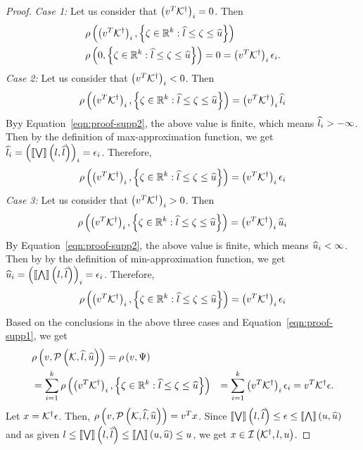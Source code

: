 \begin{proof}
{\it Case 1:} Let  us consider that $\left(v^T{\mathcal{K}}^\dagger\right)_i=0$.
Then
%
\begin{align*}
&
  \rho\left(\left(v^T{\mathcal{K}}^\dagger\right)_i,\left\{\zeta\in\mathbb{R}^k:\widehat{l}\leq\zeta\leq\widehat{u}\right\}\right)\\
& \rho\left(0,\left\{\zeta\in\mathbb{R}^k:\widehat{l}\leq\zeta\leq\widehat{u}\right\}\right)=0=\left(v^T{\mathcal{K}}^\dagger\right)_i\epsilon_i.
\end{align*}
%
{\it Case 2:} Let us consider that $\left(v^T{\mathcal{K}}^\dagger\right)_i<0$.
Then
%
\begin{align*}
&
  \rho\left(\left(v^T{\mathcal{K}}^\dagger\right)_i,\left\{\zeta\in\mathbb{R}^k:\widehat{l}\leq\zeta\leq\widehat{u}\right\}\right)=\left(v^T{\mathcal{K}}^\dagger\right)_i\widehat{l}_i\\
\end{align*}
%
Byy Equation~\ref{eqn:proof-supp2}, the above value is finite, which
means $\widehat{l}_i>-\infty$.  Then
by the definition of max-approximation function, we get
$\widehat{l}_i=\left(\left\llbracket\bigvee\right\rrbracket\left(l,\widehat{l}\right)\right)_i=\epsilon_i$.  Therefore,
%
\begin{align*}
&
  \rho\left(\left(v^T{\mathcal{K}}^\dagger\right)_i,\left\{\zeta\in\mathbb{R}^k:\widehat{l}\leq\zeta\leq\widehat{u}\right\}\right)=\left(v^T{\mathcal{K}}^\dagger\right)_i\epsilon_i\\
\end{align*}
%
{\it Case 3:}  Let us consider that
$\left(v^T{\mathcal{K}}^\dagger\right)_i>0$. Then
%
\begin{align*}
&
  \rho\left(\left(v^T{\mathcal{K}}^\dagger\right)_i,\left\{\zeta\in\mathbb{R}^k:\widehat{l}\leq\zeta\leq\widehat{u}\right\}\right)=\left(v^T{\mathcal{K}}^\dagger\right)_i\widehat{u}_i\\
\end{align*}
%
By Equation~\ref{eqn:proof-supp2}, the above value is finite, which
means $\widehat{u}_i<\infty$.  Then by
by the definition of min-approximation function, we get
$\widehat{u}_i=\left(\left\llbracket\bigwedge\right\rrbracket\left(l,\widehat{l}\right)\right)_i=\epsilon_i$.  Therefore,
%
\begin{align*}
&
  \rho\left(\left(v^T{\mathcal{K}}^\dagger\right)_i,\left\{\zeta\in\mathbb{R}^k:\widehat{l}\leq\zeta\leq\widehat{u}\right\}\right)=\left(v^T{\mathcal{K}}^\dagger\right)_i\epsilon_i\\
\end{align*}
%
Based on the conclusions in the above three
cases and Equation~\ref{eqn:proof-supp1}, we get
%
\begin{align*}
& \rho\left(v,\mathcal{P}\left(\mathcal{K},\widehat{l},\widehat{u}\right)\right)=\rho\left(v,\Psi\right)\\
& =
  \sum_{i=1}^k\rho\left(\left(v^T{\mathcal{K}}^\dagger\right)_i,\left\{\zeta\in\mathbb{R}^k:\widehat{l}\leq\zeta\leq\widehat{u}\right\}\right)
  & = \sum_{i=1}^k\left(v^T{\mathcal{K}}^\dagger\right)_i\epsilon_i=v^T{\mathcal{K}}^\dagger\epsilon.
\end{align*}
%
Let $x={\mathcal{K}}^\dagger\epsilon$.  Then,
$\rho\left(v,\mathcal{P}\left(\mathcal{K},\widehat{l},\widehat{u}\right)\right)=v^Tx$.  Since
$\left\llbracket\bigvee\right\rrbracket\left(l,\widehat{l}\right)\leq\epsilon\leq\left\llbracket\bigwedge\right\rrbracket\left(u,\widehat{u}\right)$ and as
given $l\leq\left\llbracket\bigvee\right\rrbracket\left(l,\widehat{l}\right)\leq\left\llbracket\bigwedge\right\rrbracket\left(u,\widehat{u}\right)\leq u$,
we get $x\in\mathit{\operatorname{\mathcal{I}}}\left({\mathcal{K}}^\dagger,l,u\right)$.
\end{proof}

